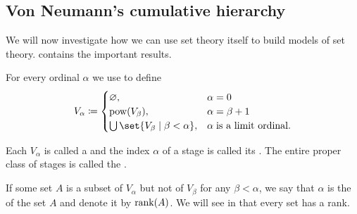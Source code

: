 \subsection{Von Neumann's cumulative hierarchy}\label{subsec:von_neumanns_cumulative_hierarchy}

We will now investigate how we can use set theory itself to build models of set theory.  contains the important results.

\begin{definition}\label{def:cumulative_hierarchy}
  For every ordinal \( \alpha \) we use  to define
  \begin{equation}\label{eq:def:cumulative_hierarchy}
    V_\alpha \coloneqq \begin{cases}
      \varnothing,                                  &\alpha = 0 \\
      \pow(V_\beta),                                &\alpha = \beta + 1 \\
      \bigcup\set{ V_\beta \given \beta < \alpha }, &\alpha \T{is a limit ordinal.}
    \end{cases}
  \end{equation}

  Each \( V_\alpha \) is called a  and the index \( \alpha \) of a stage is called its . The entire proper class of stages is called the .

  If some set \( A \) is a subset of \( V_\alpha \) but not of \( V_\beta \) for any \( \beta < \alpha \), we say that \( \alpha \) is the  of the set \( A \) and denote it by \( \operatorname{rank}(A) \). We will see in  that every set has a rank.
\end{definition}

